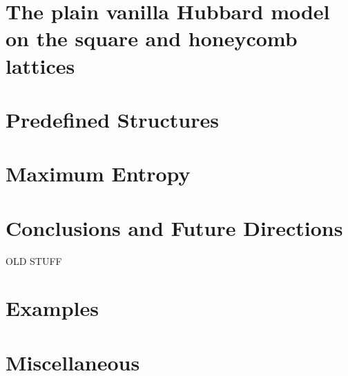 \documentclass[10pt,Arial]{scrartcl}
\begin{document}
\section{The plain vanilla Hubbard model on the square and honeycomb lattices}
\label{Hubbard_Plain}

\section{Predefined Structures}\label{sec:predefined}


\section{Maximum Entropy}\label{sec:maxent}


\section{Conclusions and Future Directions}\label{sec:con}

{\color{red} OLD STUFF} 
\section{Examples}\label{sec:ex}

\section{Miscellaneous}\label{sec:misc}








 

\printindex
{}

\end{document}

